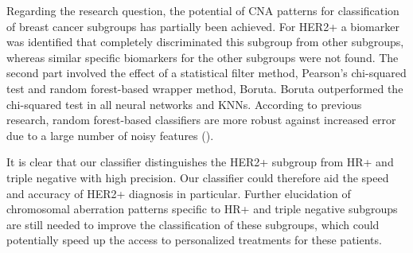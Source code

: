     Regarding the research question, the potential of CNA patterns for classification of breast cancer subgroups has partially been achieved. For HER2+ a biomarker was identified that completely discriminated this subgroup from other subgroups, whereas similar specific biomarkers for the other subgroups were not found. The second part involved the effect of a statistical filter method, Pearson's chi-squared test and random forest-based wrapper method, Boruta. Boruta outperformed the chi-squared test in all neural networks and KNNs. According to previous research, random forest-based classifiers are more robust against increased error due to a large number of noisy features (\cite{Fortino2014}).

    It is clear that our classifier distinguishes the HER2+ subgroup from HR+ and triple negative with high precision.  Our classifier could therefore aid the speed and accuracy of HER2+ diagnosis in particular. Further elucidation of chromosomal aberration patterns specific to HR+ and triple negative subgroups are still needed to improve the classification of these subgroups, which could potentially speed up the access to personalized treatments for these patients.
